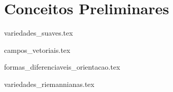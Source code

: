 \chapter{Conceitos Preliminares}

{variedades_suaves.tex}

{campos_vetoriais.tex}
	
{formas_diferenciaveis_orientacao.tex}	



{variedades_riemannianas.tex}